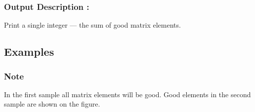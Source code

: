 \documentclass{article}
\begin{document}
\subsubsection*{Output Description : }Print a single integer — the sum of good matrix elements.
\subsection*{Examples}
\subsubsection*{Note}In the first sample all matrix elements will be good. Good elements in the second sample are shown on the figure.
\end{document}
